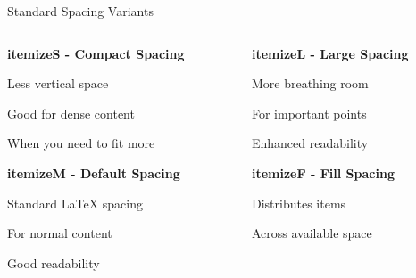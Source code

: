 \documentclass[11pt,compress,t,notes=noshow, xcolor=table]{beamer}
\begin{document}
\begin{frame}{Standard Spacing Variants}
  \begin{columns}[T]
    \begin{column}{0.48\textwidth}
      \textbf{itemizeS - Compact Spacing}
      \begin{itemizeS}
        \item Less vertical space
        \item Good for dense content
        \item When you need to fit more
      \end{itemizeS}
      
      \vspace{0.5cm}
      \textbf{itemizeM - Default Spacing}
      \begin{itemizeM}
        \item Standard LaTeX spacing
        \item For normal content
        \item Good readability
      \end{itemizeM}
    \end{column}
    
    \begin{column}{0.48\textwidth}
      \textbf{itemizeL - Large Spacing}
      \begin{itemizeL}
        \item More breathing room
        \item For important points
        \item Enhanced readability
      \end{itemizeL}
      
      \vspace{0.5cm}
      \textbf{itemizeF - Fill Spacing}
      \begin{minipage}[t][5em][t]{\textwidth}
        \begin{itemizeF}
          \item Distributes items
          \item Across available space
        \end{itemizeF}
      \end{minipage}
    \end{column}
  \end{columns}
\end{frame}

\end{document}

